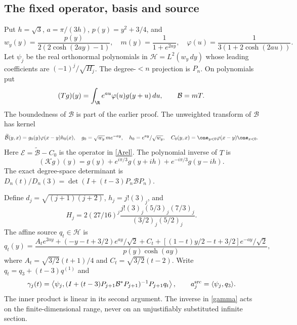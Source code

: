\subsection{The fixed operator, basis and source}
Put $h=\sqrt3$, $a=\pi/(3h)$, $p(y)=y^2+3/4$, and
\begin{equation}\label{realdefinitions}
 w_y(y)=\frac{p(y)}{2(2\cosh(2ay)-1)},\quad
 m(y)=\frac1{1+e^{2ay}},\quad
 \varphi(u)=\frac1{3(1+2\cosh(2au))}.
\end{equation}
Let $\psi_j$ be the real orthonormal polynomials in
$\mathcal H=L^2(w_y\,dy)$ whose leading coefficients are
$(-1)^j/\sqrt{H_j}$. The degree-$<n$ projection is $P_n$.
On polynomials put
\[
 (Tg)(y)=\int_\R e^{au}\varphi(u)g(y+u)\,du,\qquad \mathcal B=mT.
\]
The boundedness of $\mathcal B$ is part of the earlier proof.
The unweighted transform of $\mathcal B$ has kernel
\begin{equation}\label{kernelreal}
 \widetilde{\mathcal B}(y,x)=g_0(y)\varphi(x-y)h_0(x),\quad
 g_0=\sqrt{w_y}\,m e^{-ay},\quad h_0=e^{ay}/\sqrt{w_y},
 \quad C_0(y,x)=\one_{y<0}\varphi(x-y)\one_{x<0}.
\end{equation}
Here $\mathcal E=\widetilde{\mathcal B}-C_0$ is the operator in
\eqref{Arel}. The polynomial inverse of $T$ is
\[
 (\mathcal Kg)(y)=g(y)+e^{i\pi/3}g(y+ih)+e^{-i\pi/3}g(y-ih).
\]
The exact degree-space determinant is
$D_n(t)/D_n(3)=\det(I+(t-3)P_n\mathcal B P_n)$.

Define $d_j=\sqrt{(j+1)(j+2)}$, $h_j=j!(3)_j$, and
\begin{equation}\label{Hnorm}
 H_j=2(27/16)^j
       \frac{j!(3)_j(5/3)_j(7/3)_j}{(3/2)_j(5/2)_j}.
\end{equation}
The affine source $q_t\in\mathcal H$ is
\begin{equation}\label{qsource}
 q_t(y)=\frac{A_t e^{2ay}+(-y-t+3/2)e^{ay}/\sqrt2+C_t
           +[(1-t)y/2-t+3/2]e^{-ay}/\sqrt2}{p(y)\cosh(ay)},
\end{equation}
where $A_t=\sqrt{3/2}(t+1)/4$ and $C_t=\sqrt{3/2}(t-2)$.
Write $q_t=q_3+(t-3)q^{(1)}$ and
\begin{equation}\label{gamma}
 \gamma_j(t)=\left\langle\psi_j,
   (I+(t-3)P_{j+1}\mathcal B^*P_{j+1})^{-1}P_{j+1}q_t\right\rangle,
 \qquad a_j^{\rm src}=\langle\psi_j,q_3\rangle.
\end{equation}
The inner product is linear in its second argument. The inverse in
\eqref{gamma} acts on the finite-dimensional range, never on an
unjustifiably substituted infinite section.

